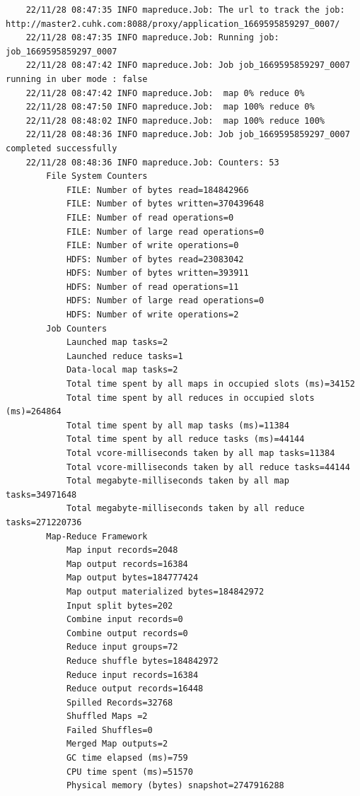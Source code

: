 \begin{lstlisting}
    22/11/28 08:47:35 INFO mapreduce.Job: The url to track the job: http://master2.cuhk.com:8088/proxy/application_1669595859297_0007/
    22/11/28 08:47:35 INFO mapreduce.Job: Running job: job_1669595859297_0007
    22/11/28 08:47:42 INFO mapreduce.Job: Job job_1669595859297_0007 running in uber mode : false
    22/11/28 08:47:42 INFO mapreduce.Job:  map 0% reduce 0%
    22/11/28 08:47:50 INFO mapreduce.Job:  map 100% reduce 0%
    22/11/28 08:48:02 INFO mapreduce.Job:  map 100% reduce 100%
    22/11/28 08:48:36 INFO mapreduce.Job: Job job_1669595859297_0007 completed successfully
    22/11/28 08:48:36 INFO mapreduce.Job: Counters: 53
        File System Counters
            FILE: Number of bytes read=184842966
            FILE: Number of bytes written=370439648
            FILE: Number of read operations=0
            FILE: Number of large read operations=0
            FILE: Number of write operations=0
            HDFS: Number of bytes read=23083042
            HDFS: Number of bytes written=393911
            HDFS: Number of read operations=11
            HDFS: Number of large read operations=0
            HDFS: Number of write operations=2
        Job Counters
            Launched map tasks=2
            Launched reduce tasks=1
            Data-local map tasks=2
            Total time spent by all maps in occupied slots (ms)=34152
            Total time spent by all reduces in occupied slots (ms)=264864
            Total time spent by all map tasks (ms)=11384
            Total time spent by all reduce tasks (ms)=44144
            Total vcore-milliseconds taken by all map tasks=11384
            Total vcore-milliseconds taken by all reduce tasks=44144
            Total megabyte-milliseconds taken by all map tasks=34971648
            Total megabyte-milliseconds taken by all reduce tasks=271220736
        Map-Reduce Framework
            Map input records=2048
            Map output records=16384
            Map output bytes=184777424
            Map output materialized bytes=184842972
            Input split bytes=202
            Combine input records=0
            Combine output records=0
            Reduce input groups=72
            Reduce shuffle bytes=184842972
            Reduce input records=16384
            Reduce output records=16448
            Spilled Records=32768
            Shuffled Maps =2
            Failed Shuffles=0
            Merged Map outputs=2
            GC time elapsed (ms)=759
            CPU time spent (ms)=51570
            Physical memory (bytes) snapshot=2747916288

\end{lstlisting}
